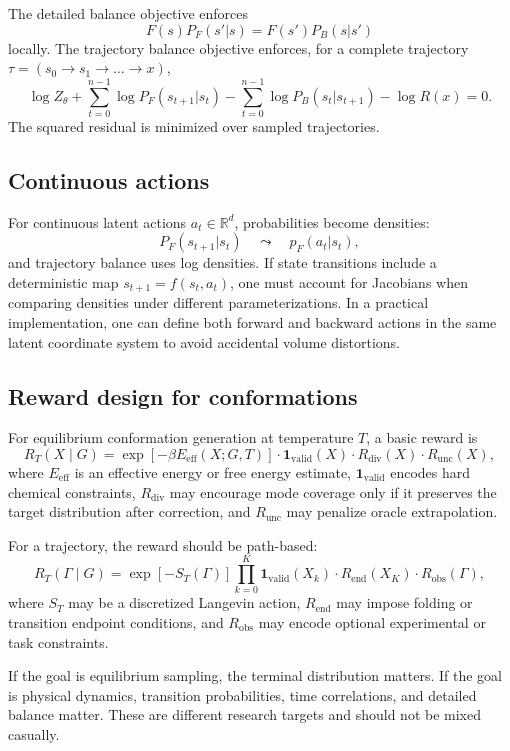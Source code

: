\documentclass[11pt]{article}
\newcommand{\R}{\mathbb{R}}
\begin{document}
The detailed balance objective enforces
\[
F(s)P_F(s'|s)=F(s')P_B(s|s')
\]
locally. The trajectory balance objective enforces, for a complete trajectory $\tau=(s_0\to s_1\to\dots\to x)$,
\[
\log Z_\theta+
\sum_{t=0}^{n-1}\log P_F(s_{t+1}|s_t)
-
\sum_{t=0}^{n-1}\log P_B(s_t|s_{t+1})
-
\log R(x)=0.
\]
The squared residual is minimized over sampled trajectories.

\subsection{Continuous actions}

For continuous latent actions $a_t\in\R^d$, probabilities become densities:
\[
P_F(s_{t+1}|s_t)\quad\leadsto\quad
p_F(a_t|s_t),
\]
and trajectory balance uses log densities. If state transitions include a deterministic map $s_{t+1}=f(s_t,a_t)$, one must account for Jacobians when comparing densities under different parameterizations. In a practical implementation, one can define both forward and backward actions in the same latent coordinate system to avoid accidental volume distortions.

\subsection{Reward design for conformations}

For equilibrium conformation generation at temperature $T$, a basic reward is
\[
R_T(X\mid G)=
\exp[-\beta E_{\mathrm{eff}}(X;G,T)]
\cdot \mathbf{1}_{\mathrm{valid}}(X)
\cdot R_{\mathrm{div}}(X)
\cdot R_{\mathrm{unc}}(X),
\]
where $E_{\mathrm{eff}}$ is an effective energy or free energy estimate, $\mathbf{1}_{\mathrm{valid}}$ encodes hard chemical constraints, $R_{\mathrm{div}}$ may encourage mode coverage only if it preserves the target distribution after correction, and $R_{\mathrm{unc}}$ may penalize oracle extrapolation.

For a trajectory, the reward should be path-based:
\[
R_T(\Gamma\mid G)=
\exp[-S_T(\Gamma)]
\prod_{k=0}^K \mathbf{1}_{\mathrm{valid}}(X_k)
\cdot R_{\mathrm{end}}(X_K)
\cdot R_{\mathrm{obs}}(\Gamma),
\]
where $S_T$ may be a discretized Langevin action, $R_{\mathrm{end}}$ may impose folding or transition endpoint conditions, and $R_{\mathrm{obs}}$ may encode optional experimental or task constraints.

If the goal is equilibrium sampling, the terminal distribution matters. If the goal is physical dynamics, transition probabilities, time correlations, and detailed balance matter. These are different research targets and should not be mixed casually.
\end{document}
